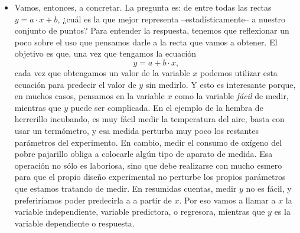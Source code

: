     \begin{itemize}
    \item Vamos, entonces, a concretar. La pregunta es: de entre todas las rectas $y=a\cdot x+b$, ¿cuál es la que mejor representa --estadísticamente-- a nuestro conjunto de puntos? Para entender la respuesta, tenemos que reflexionar un poco sobre el uso que pensamos darle a la recta que vamos a obtener. El objetivo es que, una vez que tengamos la ecuación
        \[y=a+b\cdot x,\]
        cada vez que obtengamos un valor de la variable $x$ podemos utilizar esta ecuación para {\sf predecir el valor de $y$ sin medirlo}. Y esto es interesante porque, en muchos casos, pensamos en la variable $x$ como la variable {\em fácil} de medir, mientras que $y$ puede ser complicada. En el ejemplo de la hembra de herrerillo incubando, es muy fácil medir la temperatura del aire, basta con usar un termómetro, y esa medida perturba muy poco los restantes parámetros del experimento. En cambio, medir el consumo de oxígeno del pobre pajarillo obliga a colocarle algún tipo de aparato de medida. Esa operación no sólo es laboriosa, sino que debe realizarse con mucho esmero para que el propio diseño experimental no perturbe los propios parámetros que estamos tratando de medir. En resumidas cuentas, medir $y$ no es fácil, y preferiríamos poder predecirla a a partir de $x$. Por eso vamos a llamar a $x$ la {\sf variable independiente}, {\sf variable predictora}, o {\sf regresora}, mientras que $y$ es la {\sf variable dependiente} o {\sf respuesta}.


\end{itemize}

